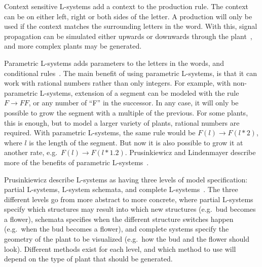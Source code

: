 
Context sensitive L-systems add a context to the production rule.
The context can be on either left, right or both sides of the letter.
A production will only be used if the context matches the surrounding letters in the word.
With this, signal propagation can be simulated either upwards or downwards through the plant~\cite{2012Prusinkiewicz}, and more complex plants may be generated.

Parametric L-systems adds parameters to the letters in the words, and conditional rules~\cite{2012Prusinkiewicz}.
The main benefit of using parametric L-systems, is that it can work with rational numbers rather than only integers.
For example, with non-parametric L-systems, extension of a segment can be modeled with the rule $F\rightarrow FF$, or any number of ``F'' in the successor.
In any case, it will only be possible to grow the segment with a multiple of the previous.
For some plants, this is enough, but to model a larger variety of plants, rational numbers are required.
With parametric L-systems, the same rule would be $F(l)\rightarrow F(l*2)$, where $l$ is the length of the segment.
But now it is also possible to grow it at another rate, e.g.\ $F(l)\rightarrow F(l*1.2)$.
Prusinkiewicz and Lindenmayer describe more of the benefits of parametric L-systems~\cite{2012Prusinkiewicz}.

Prusinkiewicz describe L-systems as having three levels of model specification: partial L-systems, L-system schemata, and complete L-systems~\cite{2012Prusinkiewicz}.
The three different levels go from more abstract to more concrete, where partial L-systems specify which structures may result into which new structures (e.g.\ bud becomes a flower), schemata specifies when the different structure switches happen (e.g.\ when the bud becomes a flower), and complete systems specify the geometry of the plant to be visualized (e.g.\ how the bud and the flower should look).
Different methods exist for each level, and which method to use will depend on the type of plant that should be generated.

